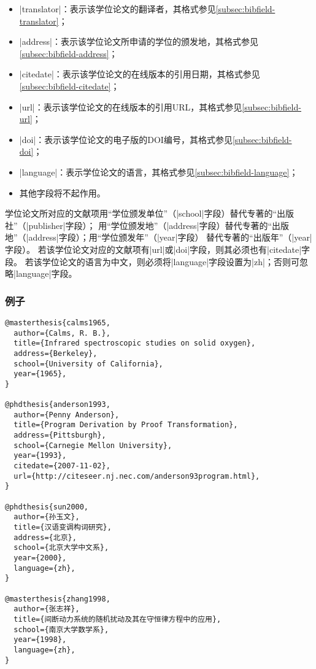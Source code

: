 \begin{itemize}
\item |translator|：表示该学位论文的翻译者，其格式参见\ref{subsec:bibfield-translator}；
\item |address|：表示该学位论文所申请的学位的颁发地，其格式参见\ref{subsec:bibfield-address}；
\item |citedate|：表示该学位论文的在线版本的引用日期，其格式参见\ref{subsec:bibfield-citedate}；
\item |url|：表示该学位论文的在线版本的引用URL，其格式参见\ref{subsec:bibfield-url}；
\item |doi|：表示该学位论文的电子版的DOI编号，其格式参见\ref{subsec:bibfield-doi}；
\item |language|：表示学位论文的语言，其格式参见\ref{subsec:bibfield-language}；
\item 其他字段将不起作用。
\end{itemize}

\begin{note}
学位论文所对应的文献项用“学位颁发单位”（|school|字段）替代专著的“出版社”（|publisher|字段）；
用“学位颁发地”（|address|字段）替代专著的“出版地”（|address|字段）；用“学位颁发年”（|year|字段）
替代专著的“出版年”（|year|字段）。
若该学位论文对应的文献项有|url|或|doi|字段，则其必须也有|citedate|字段。
若该学位论文的语言为中文，则必须将|language|字段设置为|zh|；否则可忽略|language|字段。
\end{note}

\subsubsection{例子}

\begin{verbatim}
@masterthesis{calms1965,
  author={Calms, R. B.},
  title={Infrared spectroscopic studies on solid oxygen},
  address={Berkeley},
  school={University of California},
  year={1965},
}

@phdthesis{anderson1993,
  author={Penny Anderson},
  title={Program Derivation by Proof Transformation},
  address={Pittsburgh},
  school={Carnegie Mellon University},
  year={1993},
  citedate={2007-11-02},
  url={http://citeseer.nj.nec.com/anderson93program.html},
}

@phdthesis{sun2000,
  author={孙玉文},
  title={汉语变调构词研究},
  address={北京},
  school={北京大学中文系},
  year={2000},
  language={zh},
}

@masterthesis{zhang1998,
  author={张志祥},
  title={间断动力系统的随机扰动及其在守恒律方程中的应用},
  school={南京大学数学系},
  year={1998},
  language={zh},
}
\end{verbatim}
